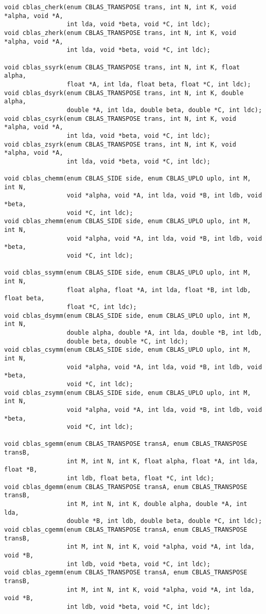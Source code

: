 \begin{verbatim}
void cblas_cherk(enum CBLAS_TRANSPOSE trans, int N, int K, void *alpha, void *A,
                 int lda, void *beta, void *C, int ldc);
void cblas_zherk(enum CBLAS_TRANSPOSE trans, int N, int K, void *alpha, void *A,
                 int lda, void *beta, void *C, int ldc);

void cblas_ssyrk(enum CBLAS_TRANSPOSE trans, int N, int K, float alpha,
                 float *A, int lda, float beta, float *C, int ldc);
void cblas_dsyrk(enum CBLAS_TRANSPOSE trans, int N, int K, double alpha,
                 double *A, int lda, double beta, double *C, int ldc);
void cblas_csyrk(enum CBLAS_TRANSPOSE trans, int N, int K, void *alpha, void *A,
                 int lda, void *beta, void *C, int ldc);
void cblas_zsyrk(enum CBLAS_TRANSPOSE trans, int N, int K, void *alpha, void *A,
                 int lda, void *beta, void *C, int ldc);

void cblas_chemm(enum CBLAS_SIDE side, enum CBLAS_UPLO uplo, int M, int N,
                 void *alpha, void *A, int lda, void *B, int ldb, void *beta,
                 void *C, int ldc);
void cblas_zhemm(enum CBLAS_SIDE side, enum CBLAS_UPLO uplo, int M, int N,
                 void *alpha, void *A, int lda, void *B, int ldb, void *beta,
                 void *C, int ldc);

void cblas_ssymm(enum CBLAS_SIDE side, enum CBLAS_UPLO uplo, int M, int N,
                 float alpha, float *A, int lda, float *B, int ldb, float beta,
                 float *C, int ldc);
void cblas_dsymm(enum CBLAS_SIDE side, enum CBLAS_UPLO uplo, int M, int N,
                 double alpha, double *A, int lda, double *B, int ldb,
                 double beta, double *C, int ldc);
void cblas_csymm(enum CBLAS_SIDE side, enum CBLAS_UPLO uplo, int M, int N,
                 void *alpha, void *A, int lda, void *B, int ldb, void *beta,
                 void *C, int ldc);
void cblas_zsymm(enum CBLAS_SIDE side, enum CBLAS_UPLO uplo, int M, int N,
                 void *alpha, void *A, int lda, void *B, int ldb, void *beta,
                 void *C, int ldc);

void cblas_sgemm(enum CBLAS_TRANSPOSE transA, enum CBLAS_TRANSPOSE transB,
                 int M, int N, int K, float alpha, float *A, int lda, float *B,
                 int ldb, float beta, float *C, int ldc);
void cblas_dgemm(enum CBLAS_TRANSPOSE transA, enum CBLAS_TRANSPOSE transB,
                 int M, int N, int K, double alpha, double *A, int lda,
                 double *B, int ldb, double beta, double *C, int ldc);
void cblas_cgemm(enum CBLAS_TRANSPOSE transA, enum CBLAS_TRANSPOSE transB,
                 int M, int N, int K, void *alpha, void *A, int lda, void *B,
                 int ldb, void *beta, void *C, int ldc);
void cblas_zgemm(enum CBLAS_TRANSPOSE transA, enum CBLAS_TRANSPOSE transB,
                 int M, int N, int K, void *alpha, void *A, int lda, void *B,
                 int ldb, void *beta, void *C, int ldc);

\end{verbatim}

